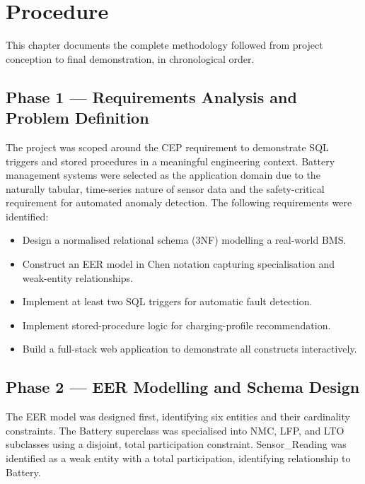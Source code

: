 \documentclass[12pt, a4paper]{report}
\begin{document}
\newpage

\chapter{Procedure}

This chapter documents the complete methodology followed from project conception to final demonstration, in chronological order.

\section{Phase 1 — Requirements Analysis and Problem Definition}
The project was scoped around the CEP requirement to demonstrate SQL triggers and stored procedures in a meaningful engineering context. Battery management systems were selected as the application domain due to the naturally tabular, time-series nature of sensor data and the safety-critical requirement for automated anomaly detection. The following requirements were identified:

\begin{itemize}
    \item Design a normalised relational schema (3NF) modelling a real-world BMS.
    \item Construct an EER model in Chen notation capturing specialisation and weak-entity relationships.
    \item Implement at least two SQL triggers for automatic fault detection.
    \item Implement stored-procedure logic for charging-profile recommendation.
    \item Build a full-stack web application to demonstrate all constructs interactively.
\end{itemize}

\section{Phase 2 — EER Modelling and Schema Design}
The EER model was designed first, identifying six entities and their cardinality constraints. The Battery superclass was specialised into NMC, LFP, and LTO subclasses using a disjoint, total participation constraint. Sensor\_Reading was identified as a weak entity with a total participation, identifying relationship to Battery.
\end{document}
